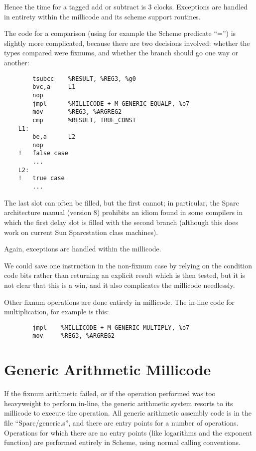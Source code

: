 Hence the time for a tagged add or subtract is 3 clocks.  Exceptions
are handled in entirety within the millicode and its scheme support
routines.

The code for a comparison (using for example the Scheme predicate
``='') is slightly more complicated, because there are two decisions
involved: whether the types compared were fixnums, and whether the
branch should go one way or another:

\begin{minipage}{\linewidth}
\begin{verbatim}
        tsubcc    %RESULT, %REG3, %g0
        bvc,a     L1
        nop
        jmpl      %MILLICODE + M_GENERIC_EQUALP, %o7
        mov       %REG3, %ARGREG2
        cmp       %RESULT, TRUE_CONST
    L1:
        be,a      L2
        nop
    !   false case
        ...
    L2:
    !   true case
        ...
\end{verbatim}
\end{minipage}

The last slot can often be filled, but the first cannot; in particular,
the Sparc architecture manual (version 8) prohibits an idiom found in
some compilers in which the first delay slot is filled with the second
branch (although this does work on current Sun Sparcstation class machines).

Again, exceptions are handled within the millicode.

We could save one instruction in the non-fixnum case by relying on the
condition code bits rather than returning an explicit result which is then
tested, but it is not clear that this is a win, and it also complicates the
millicode needlessly.

Other fixnum operations are done entirely in millicode. The in-line code
for multiplication, for example is this:

\begin{minipage}{\linewidth}
\begin{verbatim}
        jmpl    %MILLICODE + M_GENERIC_MULTIPLY, %o7
        mov     %REG3, %ARGREG2
\end{verbatim}
\end{minipage}

\section{Generic Arithmetic Millicode}

If the fixnum arithmetic failed, or if the operation performed was too
heavyweight to perform in-line, the generic arithmetic system resorts
to its millicode to execute the operation. All generic arithmetic
assembly code is in the file ``Sparc/generic.s'', and there are entry
points for a number of operations. Operations for which there are no
entry points (like logarithms and the exponent function) are
performed entirely in Scheme, using normal calling conventions.

